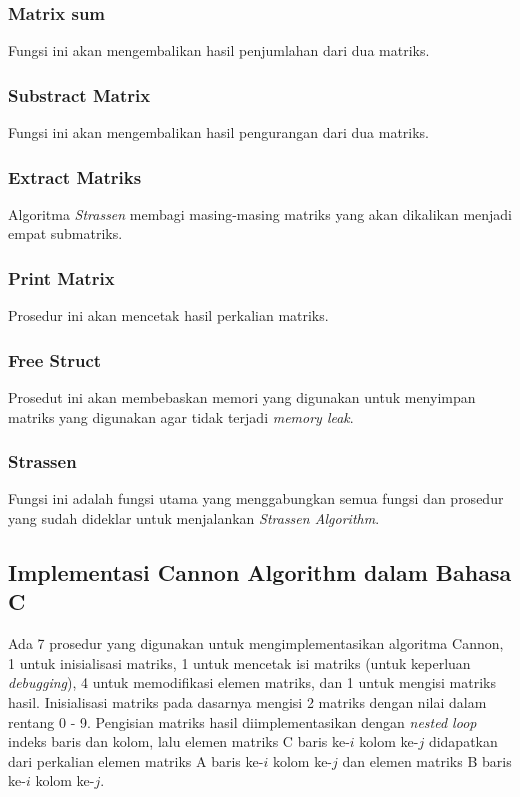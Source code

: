 \documentclass[conference]{IEEEtran}
\begin{document}
\subsubsection{Matrix sum} Fungsi ini akan mengembalikan hasil penjumlahan dari dua matriks.

\subsubsection{Substract Matrix} Fungsi ini akan mengembalikan hasil pengurangan dari dua matriks.

\subsubsection{Extract Matriks} Algoritma \textit{Strassen} membagi masing-masing matriks yang akan dikalikan menjadi empat submatriks.

\subsubsection{Print Matrix} Prosedur ini akan mencetak hasil perkalian matriks.

\subsubsection{Free Struct} Prosedut ini akan membebaskan memori yang digunakan untuk menyimpan matriks yang digunakan agar tidak terjadi \textit{memory leak}.

\subsubsection{Strassen} Fungsi ini adalah fungsi utama yang menggabungkan semua fungsi dan prosedur yang sudah dideklar untuk menjalankan \textit{Strassen Algorithm}.

\subsection{Implementasi Cannon Algorithm dalam Bahasa C}
Ada 7 prosedur yang digunakan untuk mengimplementasikan algoritma Cannon, 1 untuk inisialisasi matriks, 1 untuk mencetak isi matriks (untuk keperluan \textit{debugging}), 
4 untuk memodifikasi elemen matriks, dan 1 untuk mengisi matriks hasil.
Inisialisasi matriks pada dasarnya mengisi 2 matriks dengan nilai dalam rentang 0 - 9.
Pengisian matriks hasil diimplementasikan dengan \textit{nested loop} indeks baris dan kolom, 
lalu elemen matriks C baris ke-$i$ kolom ke-$j$ didapatkan dari perkalian elemen matriks A baris ke-$i$ kolom ke-$j$ dan elemen matriks B baris ke-$i$ kolom ke-$j$.
\end{document}
